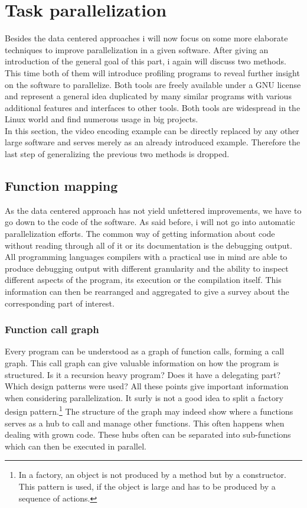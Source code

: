\section{Task parallelization}
\label{sec:task}
Besides the data centered approaches i will now focus on some more elaborate techniques to improve parallelization in a given software.
After giving an introduction of the general goal of this part, i again will discuss two methods. This time both of them will introduce profiling programs to reveal further insight on the software to parallelize. Both tools are freely available under a GNU license and represent a general idea duplicated by many similar programs with various additional features and interfaces to other tools. Both tools are widespread in the Linux world and find numerous usage in big projects.\\
In this section, the video encoding example can be directly replaced by any other large software and serves merely as an already introduced example. Therefore the last step of generalizing the previous two methods is dropped.

\subsection{Function mapping}
\label{subsec:function}
As the data centered approach has not yield unfettered improvements, we have to go down to the code of the software. As said before, i will not go into automatic parallelization efforts. The common way of getting information about code without reading through all of it or its documentation is the debugging output. All programming languages compilers with a practical use in mind are able to produce debugging output with different granularity and the ability to inspect different aspects of the program, its execution or the compilation itself. This information can then be rearranged and aggregated to give a survey about the corresponding part of interest.

\subsubsection{Function call graph}
\label{subsubsec:leafs}
Every program can be understood as a graph of function calls, forming a call graph.\cite{cgraph}
This call graph can give valuable information on how the program is structured. Is it a recursion heavy program? Does it have a delegating part? Which design patterns were used? All these points give important information when considering parallelization. It surly is not a good idea to split a factory design pattern.\footnote{In a factory, an object is not produced by a method but by a constructor. This pattern is used, if the object is large and has to be produced by a sequence of actions.}
The structure of the graph may indeed show where a functions serves as a hub to call and manage other functions. This often happens when dealing with grown code. These hubs often can be separated into sub-functions which can then be executed in parallel.

